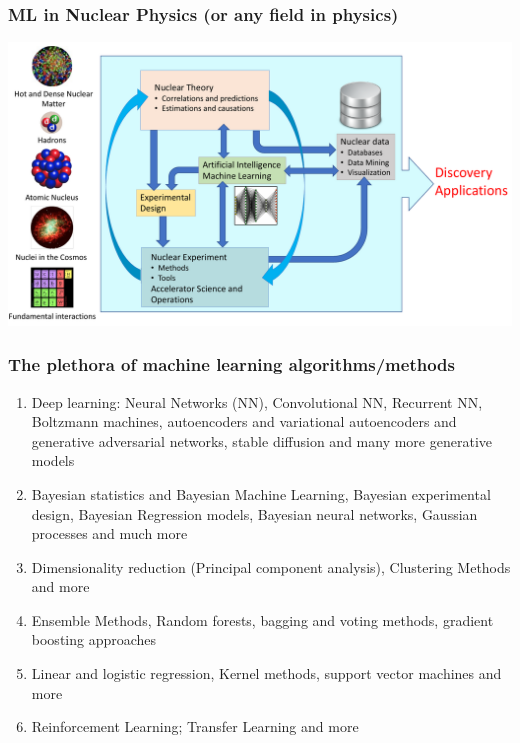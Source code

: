 \documentclass{beamer}
\begin{document}
\begin{frame}
\frametitle{ML in Nuclear  Physics (or any field in physics)}

\vspace{6mm}

\centerline{\includegraphics[width=1.0\linewidth]{figures/ML-NP.pdf}}

\vspace{6mm}
\end{frame}

\begin{frame}
\frametitle{The plethora  of machine learning algorithms/methods}

\begin{enumerate}
\item Deep learning: Neural Networks (NN), Convolutional NN, Recurrent NN, Boltzmann machines, autoencoders and variational autoencoders  and generative adversarial networks, stable diffusion and many more generative models

\item Bayesian statistics and Bayesian Machine Learning, Bayesian experimental design, Bayesian Regression models, Bayesian neural networks, Gaussian processes and much more

\item Dimensionality reduction (Principal component analysis), Clustering Methods and more

\item Ensemble Methods, Random forests, bagging and voting methods, gradient boosting approaches 

\item Linear and logistic regression, Kernel methods, support vector machines and more

\item Reinforcement Learning; Transfer Learning and more 
\end{enumerate}

\noindent
\end{frame}
\end{document}
